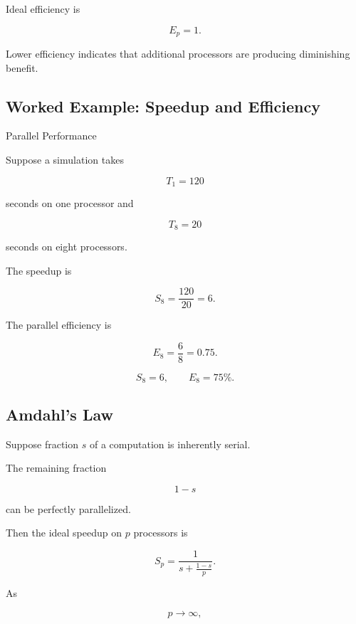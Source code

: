 Ideal efficiency is

\[
\boxed{
E_p=1.
}
\]

Lower efficiency indicates that additional processors are producing
diminishing benefit.

\subsection{Worked Example: Speedup and Efficiency}
\label{subsec:worked-speedup-efficiency}

\begin{workedexamplebox}{Parallel Performance}

Suppose a simulation takes

\[
T_1=120
\]

seconds on one processor and

\[
T_8=20
\]

seconds on eight processors.

The speedup is

\[
S_8
=
\frac{120}{20}
=
6.
\]

The parallel efficiency is

\[
E_8
=
\frac68
=
0.75.
\]

\begin{answerbox}
\[
\boxed{
S_8=6,
\qquad
E_8=75\%.
}
\]
\end{answerbox}

\end{workedexamplebox}

\subsection{Amdahl's Law}
\label{subsec:amdahls-law}

Suppose fraction \(s\) of a computation is inherently serial.

The remaining fraction

\[
1-s
\]

can be perfectly parallelized.

Then the ideal speedup on \(p\) processors is

\[
\boxed{
S_p
=
\frac{
1
}{
s+\frac{1-s}{p}
}.
}
\]

As

\[
p\to\infty,
\]

